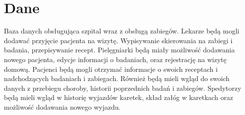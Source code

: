 \section*{Dane}
\par{
Baza danych obsługująca szpital wraz z obsługą zabiegów. Lekarze będą mogli dodawać przyjęcie pacjenta na wizytę. Wypisywanie skierowania na zabiegi i badania, przepisywanie recept. Pielęgniarki będą miały możliwość dodawania nowego pacjenta, edycje informacji o badaniach, oraz rejestrację na wizytę domową. Pacjenci będą mogli otrzymać informacje o swoich receptach i nadchodzących badaniach i zabiegach. Również będą mieli wgląd do swoich danych z przebiegu choroby, historii poprzednich badań i zabiegów. Spedytorzy będą mieli wgląd w historię wyjazdów karetek, skład załóg w karetkach oraz możliwość dodawania nowego wyjazdu.
}